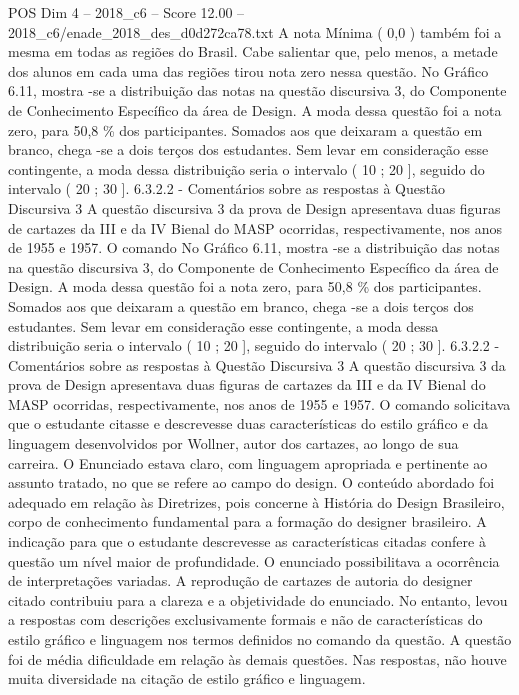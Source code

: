 \begin{textsample}{POS Dim 4 – 2018\_c6 – Score 12.00 – 2018\_c6/enade\_2018\_des\_d0d272ca78.txt}
A nota Mínima ( 0,0 ) também foi a mesma em todas as regiões do Brasil.
Cabe salientar que, pelo menos, a metade dos alunos em cada uma das regiões tirou nota zero nessa questão.
No Gráfico 6.11, mostra -se a distribuição das notas na questão discursiva 3, do Componente de Conhecimento Específico da área de Design.
A moda dessa questão foi a nota zero, para 50,8 \% dos participantes.
Somados aos que deixaram a questão em branco, chega -se a dois terços dos estudantes.
Sem levar em consideração esse contingente, a moda dessa distribuição seria o intervalo ( 10 ; 20 ], seguido do intervalo ( 20 ; 30 ]. 6.3.2.2 - Comentários sobre as respostas à Questão Discursiva 3 A questão discursiva 3 da prova de Design apresentava duas figuras de cartazes da III e da IV Bienal do MASP ocorridas, respectivamente, nos anos de 1955 e 1957.
O comando No Gráfico 6.11, mostra -se a distribuição das notas na questão discursiva 3, do Componente de Conhecimento Específico da área de Design.
A moda dessa questão foi a nota zero, para 50,8 \% dos participantes.
Somados aos que deixaram a questão em branco, chega -se a dois terços dos estudantes.
Sem levar em consideração esse contingente, a moda dessa distribuição seria o intervalo ( 10 ; 20 ], seguido do intervalo ( 20 ; 30 ]. 6.3.2.2 - Comentários sobre as respostas à Questão Discursiva 3 A questão discursiva 3 da prova de Design apresentava duas figuras de cartazes da III e da IV Bienal do MASP ocorridas, respectivamente, nos anos de 1955 e 1957.
O comando solicitava que o estudante citasse e descrevesse duas características do estilo gráfico e da linguagem desenvolvidos por Wollner, autor dos cartazes, ao longo de sua carreira.
O Enunciado estava claro, com linguagem apropriada e pertinente ao assunto tratado, no que se refere ao campo do design.
O conteúdo abordado foi adequado em relação às Diretrizes, pois concerne à História do Design Brasileiro, corpo de conhecimento fundamental para a formação do designer brasileiro.
A indicação para que o estudante descrevesse as características citadas confere à questão um nível maior de profundidade.
O enunciado possibilitava a ocorrência de interpretações variadas.
A reprodução de cartazes de autoria do designer citado contribuiu para a clareza e a objetividade do enunciado.
No entanto, levou a respostas com descrições exclusivamente formais e não de características do estilo gráfico e linguagem nos termos definidos no comando da questão.
A questão foi de média dificuldade em relação às demais questões.
Nas respostas, não houve muita diversidade na citação de estilo gráfico e linguagem.

\end{textsample}

